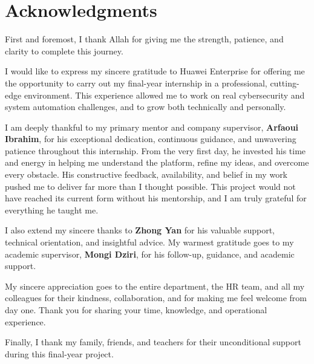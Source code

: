 \chapter*{Acknowledgments}

First and foremost, I thank Allah for giving me the strength, patience, and clarity to complete this journey.

I would like to express my sincere gratitude to Huawei Enterprise for offering me the opportunity to carry out my final-year internship in a professional, cutting-edge environment. This experience allowed me to work on real cybersecurity and system automation challenges, and to grow both technically and personally.

I am deeply thankful to my primary mentor and company supervisor, \textbf{Arfaoui Ibrahim}, for his exceptional dedication, continuous guidance, and unwavering patience throughout this internship. From the very first day, he invested his time and energy in helping me understand the platform, refine my ideas, and overcome every obstacle. His constructive feedback, availability, and belief in my work pushed me to deliver far more than I thought possible. This project would not have reached its current form without his mentorship, and I am truly grateful for everything he taught me.

I also extend my sincere thanks to \textbf{Zhong Yan} for his valuable support, technical orientation, and insightful advice. My warmest gratitude goes to my academic supervisor, \textbf{Mongi Dziri}, for his follow-up, guidance, and academic support.

My sincere appreciation goes to the entire department, the HR team, and all my colleagues for their kindness, collaboration, and for making me feel welcome from day one. Thank you for sharing your time, knowledge, and operational experience.

Finally, I thank my family, friends, and teachers for their unconditional support during this final-year project.
